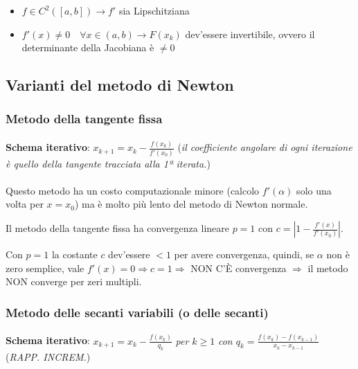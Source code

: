 \documentclass[a4paper, 11pt]{article}
\begin{document}
        \begin{itemize}
            \item $f \in C^2([a, b]) \longrightarrow f'$ sia Lipschitziana
            \item $f'(x) \neq 0 \quad \forall x \in (a, b) \longrightarrow F(x_k)$ dev'essere invertibile, ovvero il determinante della Jacobiana è $\neq 0$
        \end{itemize}


        \subsection{Varianti del metodo di Newton}

        \subsubsection{Metodo della tangente fissa}

        
        \paragraph{}
        \textbf{Schema iterativo}: $x_{k+1} = x_k - \frac{f(x_k)}{f'(x_0)}$ \quad (\textit{il coefficiente angolare di ogni iterazione è quello della tangente tracciata alla 1ª iterata.})

        \paragraph{}
        Questo metodo ha un costo computazionale minore (calcolo $f'(\alpha)$ solo una volta per $x=x_0$) ma è molto più lento del metodo di Newton normale.

        Il metodo della tangente fissa ha convergenza lineare $p=1$ con $c = \left| 1 - \frac{f'(x)}{f'(x_0)} \right|$.

        Con $p=1$ la costante $c$ dev'essere $<1$ per avere convergenza, quindi, se $\alpha$ non è zero semplice, vale $f'(x) = 0 \Rightarrow c = 1 \Rightarrow$ NON C'È convergenza $\Rightarrow$ il metodo NON converge per zeri multipli.


        \subsubsection{Metodo delle secanti variabili (o delle secanti)}

        \paragraph{}
        \textbf{Schema iterativo}: $x_{k+1} = x_k - \frac{f(x_k)}{q_k}$ \quad \textit{per $k \geq 1$} \quad \textit{con $q_k = \frac{f(x_k) - f(x_{k-1})}{x_k - x_{k-1}}$} \quad (\textit{RAPP. INCREM.})
        
\end{document}
